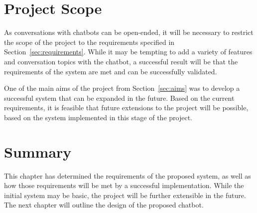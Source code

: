 \newpage
\section{Project Scope}
As conversations with chatbots can be open-ended, it will be necessary to restrict the scope of the project to the requirements specified in Section~\ref{sec:requirements}. While it may be tempting to add a variety of features and conversation topics with the chatbot, a successful result will be that the requirements of the system are met and can be successfully validated.

One of the main aims of the project from Section~\ref{sec:aims} was to develop a successful system that can be expanded in the future. Based on the current requirements, it is feasible that future extensions to the project will be possible, based on the system implemented in this stage of the project.

\section{Summary}
This chapter has determined the requirements of the proposed system, as well as how those requirements will be met by a successful implementation. While the initial system may be basic, the project will be further extensible in the future. The next chapter will outline the design of the proposed chatbot.
